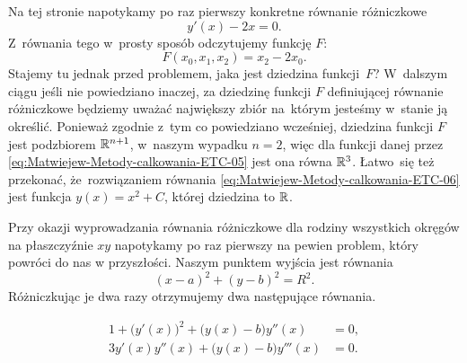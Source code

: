 \documentclass[a4paper,11pt]{article}
\begin{document}
\noindent
{} Na tej stronie napotykamy po raz pierwszy konkretne równanie
różniczkowe
\begin{equation}
  \label{eq:Matwiejew-Metody-calkowania-ETC-06}
  y'( x ) - 2 x = 0.
\end{equation}
Z~równania tego w~prosty sposób odczytujemy funkcję $F$:
\begin{equation}
  \label{eq:Matwiejew-Metody-calkowania-ETC-07}
  F( x_{ 0 }, x_{ 1 }, x_{ 2 } ) = x_{ 2 } - 2 x_{ 0 }.
\end{equation}
Stajemy tu jednak przed problemem, jaka jest dziedzina funkcji~$F$?
W~dalszym ciągu jeśli nie powiedziano inaczej, za dziedzinę funkcji $F$
definiującej równanie różniczkowe będziemy uważać największy zbiór na~którym
jesteśmy w~stanie ją określić. Ponieważ zgodnie z~tym co powiedziano
wcześniej, dziedzina funkcji $F$ jest podzbiorem $\mathbb{R}^{ n + 1 }$, w~naszym
wypadku $n = 2$, więc dla funkcji danej przez
\eqref{eq:Matwiejew-Metody-calkowania-ETC-05} jest ona równa $\mathbb{R}^{ 3 }$.
Łatwo~się też przekonać, że~rozwiązaniem równania
\eqref{eq:Matwiejew-Metody-calkowania-ETC-06} jest funkcja
$y( x ) = x^{ 2 } + C$, której dziedzina to $\mathbb{R}$.

\vspace{\VerSpaceFour}





\noindent
{} Przy okazji wyprowadzania równania różniczkowe dla rodziny
wszystkich okręgów na płaszczyźnie $xy$ napotykamy po raz pierwszy na
pewien problem, który powróci do nas w przyszłości. Naszym punktem wyjścia
jest równania
\begin{equation}
  \label{eq:Matwiejew-Metody-calkowania-ETC-08}
  ( x - a )^{ 2 } + ( y - b )^{ 2 } = R^{ 2 }.
\end{equation}
Różniczkując je dwa razy otrzymujemy dwa następujące równania.

\vspace{\negVerSpaceThree}


\begin{subequations}

  \begin{align}
    \label{eq:Matwiejew-Metody-calkowania-ETC-09-A}
    1 + \big( y'( x ) \big)^{ 2 } + \big( y( x ) - b \big) y''( x )
    &= 0, \\
    \label{eq:Matwiejew-Metody-calkowania-ETC-09-B}
    3 y'( x ) y''( x ) + \big( y( x ) - b \big) y'''( x )
    &= 0.
  \end{align}

\end{subequations}
\end{document}

